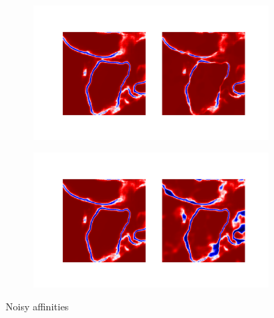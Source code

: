 % 
\begin{figure}
\centering
        \begin{subfigure}[t]{0.46 \linewidth}
        \centering
        \includegraphics[width=0.98\textwidth,trim=4.4in 1.2in 0.in 0.05in,clip]{figs/noisy_affs_merge.pdf}
    \end{subfigure}%
    \begin{subfigure}[t]{0.46 \linewidth}
        \centering
        \includegraphics[width=0.98\textwidth,trim=4.4in 1.2in 0.in 0.05in,clip]{figs/noisy_affs_split.pdf}
    \end{subfigure}\hspace{0.5cm}%
    \caption{Noisy affinities }
\end{figure}%

